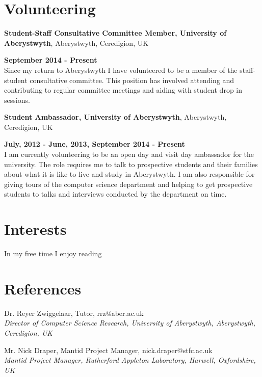 \documentclass[margin,line]{res}
\begin{document}
\begin{resume}
\section{\sc Volunteering}
{\bf Student-Staff Consultative Committee Member, University of Aberystwyth}, Aberystwyth, Ceredigion, UK
\vspace{-.3cm}

\hfill {\bf September 2014 - Present}\\
Since my return to Aberystwyth I have volunteered to be a member of the staff-student consultative committee. This position has involved attending and contributing to regular committee meetings and aiding with student drop in sessions.

{\bf Student Ambassador, University of Aberystwyth}, Aberystwyth, Ceredigion, UK

\vspace{-.3cm}
\hfill {\bf July, 2012 - June, 2013, September 2014 - Present}\\
I am currently volunteering to be an open day and visit day ambassador for the university. The role requires me to talk to prospective students and their families about what it is like to live and study in Aberystwyth. I am also responsible for giving tours of the computer science department and helping to get prospective students to talks and interviews conducted by the department on time.

\section{\sc Interests}
In my free time I enjoy reading 

\section{\sc References}
Dr. Reyer Zwiggelaar, Tutor, rrz@aber.ac.uk \\
{\em Director of Computer Science Research, University of Aberystwyth, Aberystwyth, Ceredigion, UK}

Mr. Nick Draper, Mantid Project Manager, nick.draper@stfc.ac.uk \\
{\em Mantid Project Manager, Rutherford Appleton Laboratory, Harwell, Oxfordshire, UK}

\end{resume}
\end{document}
